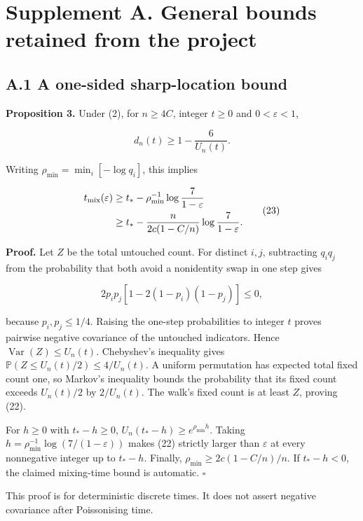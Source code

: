 \documentclass[
  british,
  11pt,
]{article}
\begin{document}
\section{Supplement A. General bounds retained from the
project}\label{supplement-a.-general-bounds-retained-from-the-project}

\subsection{A.1 A one-sided sharp-location
bound}\label{a.1-a-one-sided-sharp-location-bound}

\textbf{Proposition 3.} Under (2), for \(n\ge4C\), integer \(t\ge0\) and
\(0<\varepsilon<1\),

\[d_n(t)\ge1-\frac6{U_n(t)}. \tag{22}\]

Writing \(\rho_{\min}=\min_i[-\log q_i]\), this implies

\[
\begin{aligned}
t_{\rm mix}(\varepsilon)
&\ge t_*-\rho_{\min}^{-1}\log\frac7{1-\varepsilon}\\
&\ge t_*-\frac{n}{2c(1-C/n)}\log\frac7{1-\varepsilon}.
\end{aligned} \tag{23}
\]

\textbf{Proof.} Let \(Z\) be the total untouched count. For distinct
\(i,j\), subtracting \(q_iq_j\) from the probability that both avoid a
nonidentity swap in one step gives

\[2p_ip_j[1-2(1-p_i)(1-p_j)]\le0,\]

because \(p_i,p_j\le1/4\). Raising the one-step probabilities to integer
\(t\) proves pairwise negative covariance of the untouched indicators.
Hence \(\operatorname{Var}(Z)\le U_n(t)\). Chebyshev's inequality gives
\(\mathbb P(Z\le U_n(t)/2)\le4/U_n(t)\). A uniform permutation has
expected total fixed count one, so Markov's inequality bounds the
probability that its fixed count exceeds \(U_n(t)/2\) by \(2/U_n(t)\).
The walk's fixed count is at least \(Z\), proving (22).

For \(h\ge0\) with \(t_*-h\ge0\), \(U_n(t_*-h)\ge e^{\rho_{\min}h}\).
Taking \(h=\rho_{\min}^{-1}\log(7/(1-\varepsilon))\) makes (22) strictly
larger than \(\varepsilon\) at every nonnegative integer up to
\(t_*-h\). Finally, \(\rho_{\min}\ge2c(1-C/n)/n\). If \(t_*-h<0\), the
claimed mixing-time bound is automatic. \(\square\)

This proof is for deterministic discrete times. It does not assert
negative covariance after Poissonising time.
\end{document}
